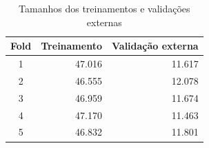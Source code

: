 \begin{table}[htbp]
\centering\small
\caption{Tamanhos dos treinamentos e validações externas}\label{tab:folds}
\begin{tabular}{crr}
\toprule
Fold & Treinamento & Validação externa\\\midrule
1 & 47.016 & 11.617\\
2 & 46.555 & 12.078\\
3 & 46.959 & 11.674\\
4 & 47.170 & 11.463\\
5 & 46.832 & 11.801\\
\bottomrule
\end{tabular}
\end{table}
